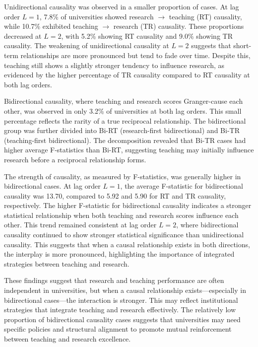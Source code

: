 \documentclass[conference]{IEEEtran}
\begin{document}
Unidirectional causality was observed in a smaller proportion of cases. At lag order $L=1$, 7.8\% of universities showed research $\rightarrow$ teaching (RT) causality, while 10.7\% exhibited teaching $\rightarrow$ research (TR) causality. These proportions decreased at $L=2$, with 5.2\% showing RT causality and 9.0\% showing TR causality. The weakening of unidirectional causality at $L=2$ suggests that short-term relationships are more pronounced but tend to fade over time. Despite this, teaching still shows a slightly stronger tendency to influence research, as evidenced by the higher percentage of TR causality compared to RT causality at both lag orders.

Bidirectional causality, where teaching and research scores Granger-cause each other, was observed in only 3.2\% of universities at both lag orders. This small percentage reflects the rarity of a true reciprocal relationship. The bidirectional group was further divided into Bi-RT (research-first bidirectional) and Bi-TR (teaching-first bidirectional). The decomposition revealed that Bi-TR cases had higher average F-statistics than Bi-RT, suggesting teaching may initially influence research before a reciprocal relationship forms.

The strength of causality, as measured by F-statistics, was generally higher in bidirectional cases. At lag order $L=1$, the average F-statistic for bidirectional causality was 13.70, compared to 5.92 and 5.90 for RT and TR causality, respectively. The higher F-statistic for bidirectional causality indicates a stronger statistical relationship when both teaching and research scores influence each other. This trend remained consistent at lag order $L=2$, where bidirectional causality continued to show stronger statistical significance than unidirectional causality. This suggests that when a causal relationship exists in both directions, the interplay is more pronounced, highlighting the importance of integrated strategies between teaching and research.

These findings suggest that research and teaching performance are often independent in universities, but when a causal relationship exists—especially in bidirectional cases—the interaction is stronger. This may reflect institutional strategies that integrate teaching and research effectively. The relatively low proportion of bidirectional causality cases suggests that universities may need specific policies and structural alignment to promote mutual reinforcement between teaching and research excellence.
\end{document}
